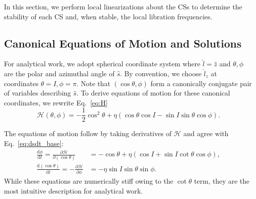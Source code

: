 \documentclass[
        fleqn,
        usenatbib,
        referee,
    ]{mnras}
\newcommand*{\rd}[2]{\frac{\mathrm{d}#1}{\mathrm{d}#2}}
\newcommand*{\pd}[2]{\frac{\partial#1}{\partial#2}}
\newcommand*{\p}[1]{\left(#1\right)}
\begin{document}
In this section, we perform local linearizations about the CSs to determine the
stability of each CS and, when stable, the local libration frequencies.

\subsection{Canonical Equations of Motion and Solutions}

For analytical work, we adopt spherical coordinate system where $\hat{l} =
\hat{z}$ and $\theta, \phi$ are the polar and azimuthal angle of $\hat{s}$. By
convention, we choose $\hat{l}_z$ at coordinates $\theta = I, \phi = \pi$.
Note that $\p{\cos \theta, \phi}$ form a canonically conjugate pair of variables
describing $\hat{s}$. To derive equations of motion for these canonical
coordinates, we rewrite Eq.~\eqref{eq:H}
\begin{equation}
    \mathcal{H}\p{\theta, \phi} = -\frac{1}{2}\cos^2\theta
            + \eta \p{\cos \theta \cos I - \sin I \sin \theta \cos \phi}.
\end{equation}

The equations of motion follow by taking derivatives of $\mathcal{H}$ and agree
with Eq.~\eqref{eq:dsdt_base}:
\begin{subequations}\label{se:H_eom}
    \begin{align}
        \rd{\phi}{t} = \pd{\mathcal{H}}{(\cos\theta)}
            &= -\cos\theta + \eta\p{\cos I + \sin I \cot \theta \cos \phi},
                \label{seq:H_eom_phi_t}\\
        \rd{(\cos \theta)}{t} = -\pd{\mathcal{H}}{\phi}
            &= -\eta \sin I \sin \theta \sin \phi.
                \label{seq:H_eom_mu_t}
    \end{align}
\end{subequations}
While these equations are numerically stiff owing to the $\cot\theta$ term, they
are the most intuitive description for analytical work.
\end{document}
